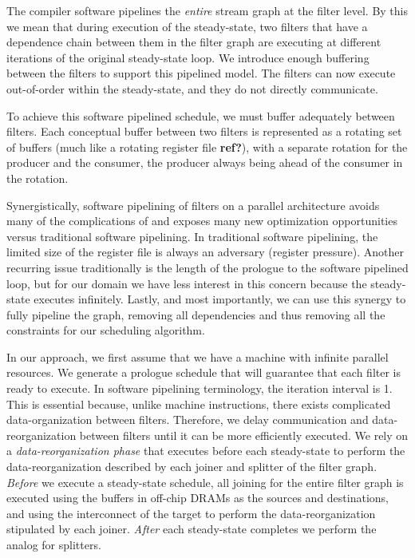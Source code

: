 The compiler software pipelines the {\it entire} stream graph at the
filter level. By this we mean that during execution of the
steady-state, two filters that have a dependence chain between them in
the filter graph are executing at different iterations of the original
steady-state loop.  We introduce enough buffering between the filters
to support this pipelined model. The filters can now execute
out-of-order within the steady-state, and they do not directly
communicate.  

To achieve this software pipelined schedule, we must buffer adequately
between filters.  Each conceptual buffer between two filters is
represented as a rotating set of buffers (much like a rotating
register file \textbf{ref?}), with a separate rotation for the
producer and the consumer, the producer always being ahead of the
consumer in the rotation.

Synergistically, software pipelining of filters on a parallel
architecture avoids many of the complications of and exposes many new
optimization opportunities versus traditional software pipelining.  In
traditional software pipelining, the limited size of the register file
is always an adversary (register pressure).  Another recurring issue
traditionally is the length of the prologue to the software pipelined
loop, but for our domain we have less interest in this concern because
the steady-state executes infinitely.  Lastly, and most importantly,
we can use this synergy to fully pipeline the graph, removing all
dependencies and thus removing all the constraints for our scheduling
algorithm.

In our approach, we first assume that we have a machine with infinite
parallel resources.  We generate a prologue schedule that will
guarantee that each filter is ready to execute.  In software pipelining
terminology, the iteration interval is 1.  This is essential because,
unlike machine instructions, there exists complicated
data-organization between filters. Therefore, we delay communication
and data-reorganization between filters until it can be more
efficiently executed.  We rely on a {\it data-reorganization
phase} that executes before each steady-state to perform the
data-reorganization described by each joiner and splitter of the filter
graph.  {\it Before} we execute a steady-state schedule, all joining
for the entire filter graph is executed using the buffers in off-chip
DRAMs as the sources and destinations, and using the interconnect of
the target to perform the data-reorganization stipulated by each
joiner.  {\it After} each steady-state completes we perform the analog
for splitters.

